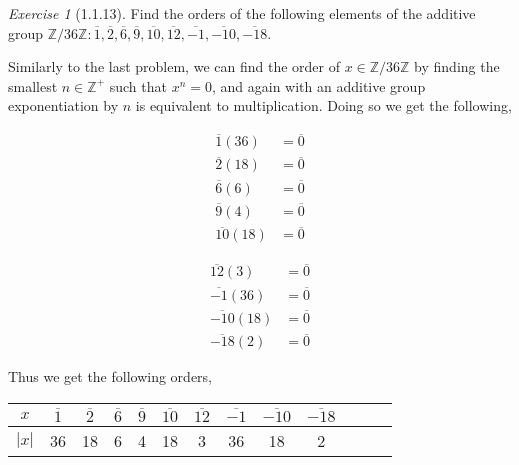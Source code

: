 \documentclass[12pt]{amsart}
\makeatletter
\theoremstyle{remark}
\newtheorem*{exercise}{Exercise}%
\def\ZZ{\ensuremath{\mathbb Z}}
\renewenvironment{proof}[1][\proofname]{\par\doublespacing
  \pushQED{\qed}%
  \normalfont \topsep6\p@\@plus6\p@\relax
  \list{}{%
    \settowidth{\leftmargin}{\itshape\proofname:\hskip\labelsep}%
    \setlength{\labelwidth}{0pt}%
    \setlength{\itemindent}{-\leftmargin}%
  }%
  \item[\hskip\labelsep\itshape#1\@addpunct{:}]\ignorespaces
}{%
  \popQED\endlist\@endpefalse
  \singlespacing
}
\theoremstyle{mycomment}
\makeatother
\begin{document}
\begin{exercise}[1.1.13] Find the orders of the following elements of the additive group $\ZZ/36\ZZ: \overline{1},\overline{2},\overline{6}, \overline{9}, \overline{10}, \overline{12}, \overline{-1}, \overline{-10}, \overline{-18}$.
  \begin{proof}[Solution:]
    Similarly to the last problem, we can find the order of $x \in \ZZ/36\ZZ$ by finding the smallest $n \in \ZZ^+$ such that $x^n = 0$, and again with an 
    additive group exponentiation by $n$ is equivalent to multiplication. Doing so we get the following, 
    \begin{center}
      \begin{minipage}{.45\textwidth}
    \begin{align*}
      \overline{1}(36) &= \overline{0}\\
      \overline{2}(18) &= \overline{0}\\
      \overline{6}(6) &= \overline{0}\\
      \overline{9}(4) &= \overline{0}\\
      \overline{10}(18) &= \overline{0}
    \end{align*}
    \end{minipage}
    \hfill
        \begin{minipage}{.45\textwidth}
          \begin{align*}
      \overline{12}(3) &= \overline{0}\\
      \overline{-1}(36) &= \overline{0}\\
      \overline{-10}(18) &= \overline{0}\\
      \overline{-18}(2) &= \overline{0}
    \end{align*}
  \end{minipage}
\end{center}
    Thus we get the following orders, 
    \begin{center}
    \begin{tabular}{c | c  c  c  c  c  c  c  c  c  c  c  c  }
      $x$ &$\overline{1}$ &$\overline{2}$ &$\overline{6}$ & $\overline{9}$ & $\overline{10}$ & $\overline{12}$ & $\overline{-1}$ & $\overline{-10}$ & $\overline{-18}$\\
      \hline
      $|x|$& 36 & 18 & 6& 4& 18& 3 & 36& 18& 2
    \end{tabular}
  \end{center}
  \end{proof} 
\end{exercise}
\end{document}
